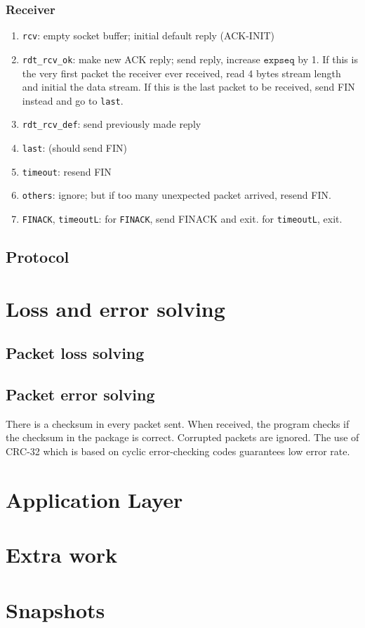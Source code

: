 \documentclass[10pt,a4paper]{article}
\begin{document}
    \subsubsection{Receiver}
    \begin{enumerate}
        \item \texttt{rcv}: empty socket buffer; initial default reply (ACK-INIT)
        \item \texttt{rdt\_rcv\_ok}: make new ACK reply; send reply, increase $\texttt{expseq}$ by 1. If this is the very first packet the receiver ever received, read 4 bytes stream length and initial the data stream. If this is the last packet to be received, send FIN instead and go to \texttt{last}.
        \item \texttt{rdt\_rcv\_def}: send previously made reply
        \item \texttt{last}: (should send FIN)
        \item \texttt{timeout}: resend FIN
        \item \texttt{others}: ignore; but if too many unexpected packet arrived, resend FIN.
        \item \texttt{FINACK}, \texttt{timeoutL}: for \texttt{FINACK}, send FINACK and exit. for \texttt{timeoutL}, exit.
    \end{enumerate}
\subsection{Protocol}
\section{Loss and error solving}
    \subsection{Packet loss solving}
        
    \subsection{Packet error solving}
        There is a checksum in every packet sent. When received, the program checks if the checksum in the package is correct. Corrupted packets are ignored. The use of CRC-32 which is based on cyclic error-checking codes guarantees low error rate.

\section{Application Layer}
\section{Extra work}
\section{Snapshots}
\end{document}
